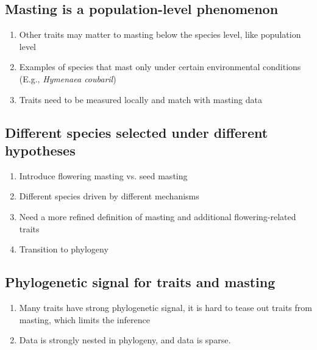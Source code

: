 \documentclass{article}
\begin{document}
\subsection{Masting is a population-level phenomenon}
\begin{enumerate}
\item Other traits may matter to masting below the species level, like population level
\item Examples of species that mast only under certain environmental conditions (E.g., \textit{Hymenaea coubaril})
\item Traits need to be measured locally and match with masting data
\end{enumerate}
\subsection{Different species selected under different hypotheses}
\begin{enumerate}
\item Introduce flowering masting vs. seed masting
\item Different species driven by different mechanisms
\item Need a more refined definition of masting and additional flowering-related traits
\item Transition to phylogeny
\end{enumerate}
\subsection{Phylogenetic signal for traits and masting}
\begin{enumerate}
\item Many traits have strong phylogenetic signal, it is hard to tease out traits from masting, which limits the inference
\item Data is strongly nested in phylogeny, and data is sparse.
\end{enumerate}
\end{document}
